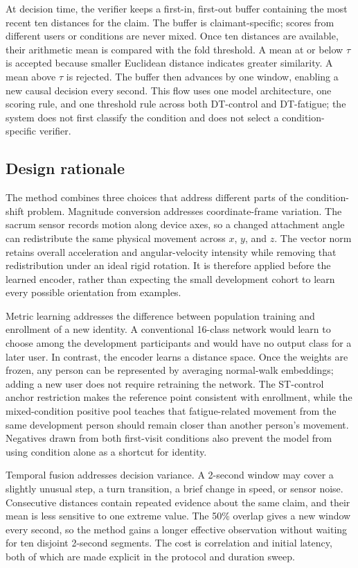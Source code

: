 \documentclass[conference]{IEEEtran}
\begin{document}
At decision time, the verifier keeps a first-in, first-out buffer containing the most recent ten distances for the claim. The buffer is claimant-specific; scores from different users or conditions are never mixed. Once ten distances are available, their arithmetic mean is compared with the fold threshold. A mean at or below $\tau$ is accepted because smaller Euclidean distance indicates greater similarity. A mean above $\tau$ is rejected. The buffer then advances by one window, enabling a new causal decision every second. This flow uses one model architecture, one scoring rule, and one threshold rule across both DT-control and DT-fatigue; the system does not first classify the condition and does not select a condition-specific verifier.

\subsection{Design rationale}
The method combines three choices that address different parts of the condition-shift problem. Magnitude conversion addresses coordinate-frame variation. The sacrum sensor records motion along device axes, so a changed attachment angle can redistribute the same physical movement across $x$, $y$, and $z$. The vector norm retains overall acceleration and angular-velocity intensity while removing that redistribution under an ideal rigid rotation. It is therefore applied before the learned encoder, rather than expecting the small development cohort to learn every possible orientation from examples.

Metric learning addresses the difference between population training and enrollment of a new identity. A conventional 16-class network would learn to choose among the development participants and would have no output class for a later user. In contrast, the encoder learns a distance space. Once the weights are frozen, any person can be represented by averaging normal-walk embeddings; adding a new user does not require retraining the network. The ST-control anchor restriction makes the reference point consistent with enrollment, while the mixed-condition positive pool teaches that fatigue-related movement from the same development person should remain closer than another person's movement. Negatives drawn from both first-visit conditions also prevent the model from using condition alone as a shortcut for identity.

Temporal fusion addresses decision variance. A 2-second window may cover a slightly unusual step, a turn transition, a brief change in speed, or sensor noise. Consecutive distances contain repeated evidence about the same claim, and their mean is less sensitive to one extreme value. The 50\% overlap gives a new window every second, so the method gains a longer effective observation without waiting for ten disjoint 2-second segments. The cost is correlation and initial latency, both of which are made explicit in the protocol and duration sweep.
\end{document}
